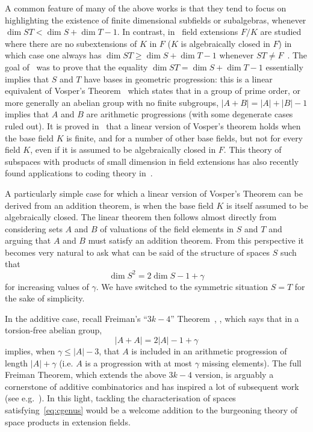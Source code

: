 \documentclass[10pt]{amsart}
\theoremstyle{definition}
\theoremstyle{remark}
\renewcommand{\geq}{\geqslant}
\renewcommand{\leq}{\leqslant}
\begin{document}
A common feature of {many of} the above works is that they tend to focus on highlighting the existence of finite dimensional subfields or subalgebras, whenever $\dim ST < \dim S + \dim T -1$. In contrast, in~\cite{bszVosper} field extensions $F/K$ are studied where there are no subextensions of $K$ in $F$ ($K$ is algebraically closed in $F$) in which case one always has $\dim ST\geq\dim S +\dim T -1$ whenever $ST\neq F$~\cite{el09}. The goal of~\cite{bszVosper} was to prove that the equality $\dim ST=\dim S +\dim T -1$ essentially implies that $S$ and $T$ have bases in geometric progression: this is a linear equivalent of Vosper's Theorem~\cite{Vosper} which states that in a group of prime order, or more generally an abelian group with no finite subgroups, $|A+B|=|A|+|B|-1$ implies that $A$ and $B$ are arithmetic progressions (with some degenerate cases ruled out). It is proved in~\cite{bszVosper} that a linear version of Vosper's theorem holds when the base field $K$ is finite, and for a number of other base fields, but not for every field $K$, even if it is assumed to be algebraically closed in $F$. This theory of subspaces with products of small dimension in field extensions has also recently found applications to coding theory in~\cite{RRT18}.

A particularly simple case for which a linear version of Vosper's Theorem can be derived from an addition theorem, is when the base field $K$ is itself assumed to be algebraically closed. The linear theorem then follows almost directly from considering sets $A$ and $B$ of valuations of the field elements in $S$ and $T$ and arguing that $A$ and $B$ must satisfy an addition theorem. From this perspective it becomes very natural to ask what can be said of the structure of spaces $S$ such that
\begin{equation}\label{eq:cgenus}
\dim S^2=2\dim S -1 +\gamma
\end{equation}
for increasing values of $\gamma$. We have switched to the symmetric situation $S=T$ for the sake of simplicity.

In the additive case, recall Freiman's ``$3k-4$'' Theorem~\cite{Freiman}, \cite[Theorem~5.11]{TaoVu}, which says that in a torsion-free abelian group,
\[
|A+A|=2|A|-1+\gamma
\]
implies, when $\gamma\leq|A|-3$, that $A$ is included in an arithmetic progression of length $|A|+\gamma$ (i.e. $A$ is a progression with at most $\gamma$ missing elements). The full Freiman Theorem, which extends the above $3k-4$ version, is arguably a cornerstone of additive combinatorics and has inspired a lot of subsequent work (see e.g.~\cite{TaoVu}). In this light, tackling the characterisation of spaces satisfying~\eqref{eq:cgenus} would be a welcome addition to the burgeoning theory of space products in extension fields.
\end{document}
